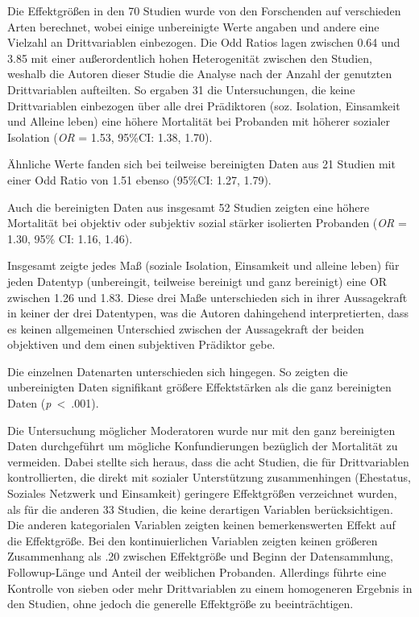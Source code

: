 \documentclass[doc]{apa6}
\begin{document}
        Die Effektgrößen in den 70 Studien wurde von den Forschenden auf verschieden Arten berechnet, wobei einige unbereinigte Werte angaben und andere eine Vielzahl an Drittvariablen einbezogen. Die Odd Ratios lagen zwischen 0.64 und 3.85 mit einer außerordentlich hohen Heterogenität zwischen den Studien, weshalb die Autoren dieser Studie die Analyse nach der Anzahl der genutzten Drittvariablen aufteilten. So ergaben 31 die Untersuchungen, die keine Drittvariablen einbezogen über alle drei Prädiktoren (soz. Isolation, Einsamkeit und Alleine leben) eine höhere Mortalität bei Probanden mit höherer sozialer Isolation (\textit{OR} = 1.53, 95\%CI: 1.38, 1.70).
        
        Ähnliche Werte fanden sich bei teilweise bereinigten Daten aus 21 Studien mit einer Odd Ratio von 1.51 ebenso (95\%CI: 1.27, 1.79). 
        
        Auch die bereinigten Daten aus insgesamt 52 Studien zeigten eine höhere Mortalität bei objektiv oder subjektiv sozial stärker isolierten Probanden (\textit{OR} = 1.30, 95\% CI: 1.16, 1.46). 
        
        Insgesamt zeigte jedes Maß (soziale Isolation, Einsamkeit und alleine leben) für jeden Datentyp (unbereingit, teilweise bereinigt und ganz bereinigt) eine OR zwischen 1.26 und 1.83. Diese drei Maße unterschieden sich in ihrer Aussagekraft in keiner der drei Datentypen, was die Autoren dahingehend interpretierten, dass es keinen allgemeinen Unterschied zwischen der Aussagekraft der beiden objektiven und dem einen subjektiven Prädiktor gebe.
        
        Die einzelnen Datenarten unterschieden sich hingegen. So zeigten die unbereinigten Daten signifikant größere Effektstärken als die ganz bereinigten Daten (\textit{p}~<~.001). 
        
        Die Untersuchung möglicher Moderatoren wurde nur mit den ganz bereinigten Daten durchgeführt um mögliche Konfundierungen bezüglich der Mortalität zu vermeiden. Dabei stellte sich heraus, dass die acht Studien, die für Drittvariablen kontrollierten, die direkt mit sozialer Unterstützung zusammenhingen (Ehestatus, Soziales Netzwerk und Einsamkeit) geringere Effektgrößen verzeichnet wurden, als für die anderen 33 Studien, die keine derartigen Variablen berücksichtigen. Die anderen kategorialen Variablen zeigten keinen bemerkenswerten Effekt auf die Effektgröße.
        Bei den kontinuierlichen Variablen zeigten keinen größeren Zusammenhang als .20 zwischen Effektgröße und Beginn der Datensammlung, Followup-Länge und Anteil der weiblichen Probanden.
        Allerdings führte eine Kontrolle von sieben oder mehr Drittvariablen zu einem homogeneren Ergebnis in den Studien, ohne jedoch die generelle Effektgröße zu beeinträchtigen.
        
\end{document}
